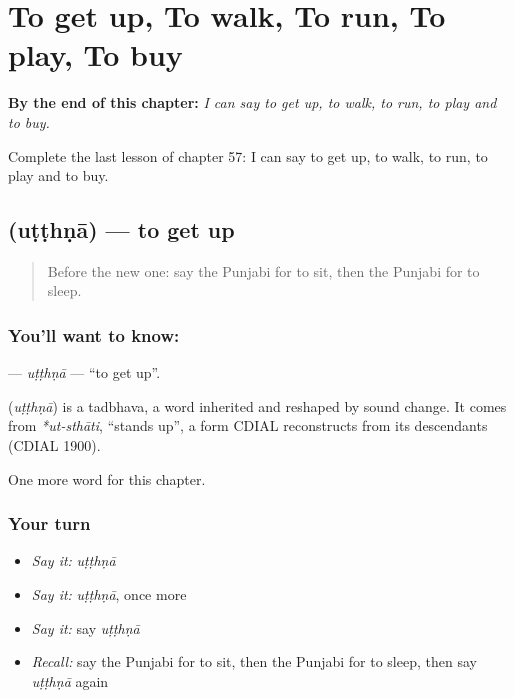 
\chapter{To get up, To walk, To run, To play, To buy}
\label{ch:pa-to-get-up-to-walk-to-run-to-play-to-buy}

\begin{chapteropening}
\textbf{By the end of this chapter:} \emph{I can say to get up, to walk, to run, to play and to buy.}

Complete the last lesson of chapter 57: I can say to get up, to walk, to run, to play and to buy.
\end{chapteropening}

\section[\texorpdfstring{\pa{ਉੱਠਣਾ} (uṭṭhṇā)}{ਉੱਠਣਾ (uṭṭhṇā)}]{ (uṭṭhṇā) — to get up}

\label{lesson:PA-C57-utthna}



\begin{quote}
Before the new one: say the Punjabi for to sit, then the Punjabi for to sleep.
\end{quote}

\subsection*{You'll want to know: }
\textbf{} — \emph{uṭṭhṇā} — \textquotedblleft{}to get up\textquotedblright{}.

\begin{cousinweb}
\textbf{} (\emph{uṭṭhṇā}) is a tadbhava, a word inherited and reshaped by sound change. It comes from \emph{*ut-sthāti}, \textquotedblleft{}stands up\textquotedblright{}, a form CDIAL reconstructs from its descendants (CDIAL 1900).
\end{cousinweb}

\begin{grammarlens}[title={What you've built}]
One more word for this chapter.
\end{grammarlens}

\subsection*{Your turn}
\begin{itemize}
\raggedright
  \item \emph{Say it:} \emph{uṭṭhṇā}
  \item \emph{Say it:} \emph{uṭṭhṇā}, once more
  \item \emph{Say it:} say \emph{uṭṭhṇā}
  \item \emph{Recall:} say the Punjabi for to sit, then the Punjabi for to sleep, then say \emph{uṭṭhṇā} again
\end{itemize}


